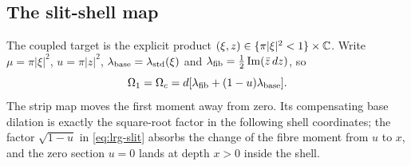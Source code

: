 \subsection{The slit-shell map}\label{sec:two-slit}

The coupled target is the explicit product $(\xi,z)\in\{\pi|\xi|^2<1\}\times\mathbb{C}$.
Write $\mu=\pi|\xi|^2$, $u=\pi|z|^2$, $\lambda_{\rm base}=\lambda_{\rm std}(\xi)$ and
$\lambda_{\rm fib}=\frac12\operatorname{Im}(\bar z\,dz)$, so
\begin{equation}\label{eq:two-coupled}
 \Omega_1=\Omega_c=d[\lambda_{\rm fib}+(1-u)\lambda_{\rm base}].
\end{equation}
The strip map moves the first moment away from zero. Its compensating base dilation is exactly the square-root
factor in the following shell coordinates; the factor $\sqrt{1-u}$ in \eqref{eq:lrg-slit} absorbs the change of the fibre
moment from $u$ to $x$, and the zero section $u=0$ lands at depth $x>0$ inside the shell.

